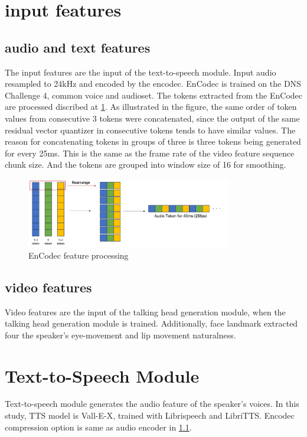\section{input features}
\subsection{audio and text features}
\label{sec:audio_and_text_features}
The input features are the input of the text-to-speech module.
Input audio resampled to 24kHz and encoded by the encodec\cite{EnCodec}.
EnCodec is trained on the DNS Challenge 4, common voice and audioset.
The tokens extracted from the EnCodec are processed discribed at \ref{fig:feature}.
As illustrated in the figure, the same order of token values from consecutive 3 tokens were concatenated,
since the output of the same residual vector quantizer in consecutive tokens tends to have similar values.
The reason for concatenating tokens in groups of three is three tokens being generated for every 25ms.
This is the same as the frame rate of the video feature sequence chunk size.
And the tokens are grouped into window size of 16 for smoothing.

\begin{figure}
    \centering
    \includegraphics[width=0.8\textwidth]{figures/figure_chap_3/feature.png}
    \caption{EnCodec feature processing}
    \label{fig:feature}
\end{figure}
 

\subsection{video features}
Video features are the input of the talking head generation module, when the talking head generation module is trained.
Additionally, face landmark extracted four the speaker's eye-movement and lip movement naturalness.



\section{Text-to-Speech Module}
Text-to-speech module generates the audio feature of the speaker's voices.
In this study, TTS model is Vall-E-X, trained with Librispeech and LibriTTS.
Encodec compression option is same as audio encoder in \ref{sec:audio_and_text_features}.

